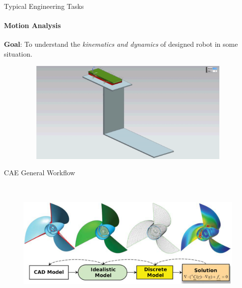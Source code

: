 \documentclass[aspectratio=169]{beamer}
\begin{document}
\begin{frame}[t]{Typical Engineering Tasks}
    \framesubtitle{Motion Analysis}
    \vspace{-0.3cm}
    \textbf{Goal}: To understand the \textit{kinematics and dynamics} of designed robot in some situation.
    \begin{figure}[H]
        \href{https://gifyu.com/image/S7Hmr}{
            \centering\includegraphics[height=5cm,width=1\textwidth,keepaspectratio]{cae_ex3_pic.png}}
        \label{fig:cae_ex3_pic.png}
    \end{figure}
\end{frame}

\begin{frame}[t]{CAE General Workflow}
\framesubtitle{}
    \vspace{-0.6cm}
    \begin{figure}[H]
        \centering\includegraphics[height=6cm,width=1\textwidth,keepaspectratio]{cae_general_guideline.png}
        \label{fig:cae_general_guideline.png}
    \end{figure}
\end{frame}
\end{document}
